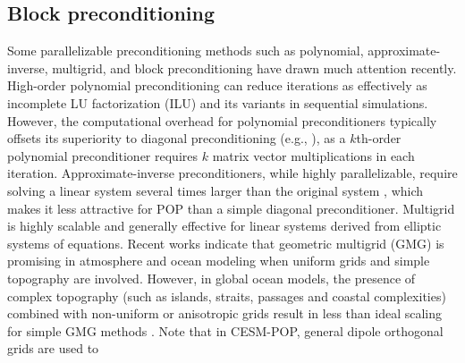 \subsection{Block preconditioning}


Some parallelizable preconditioning methods such as polynomial,
approximate-inverse, multigrid, and block preconditioning have
drawn much attention recently.  High-order polynomial preconditioning
can reduce iterations as effectively as incomplete LU factorization
(ILU) and its variants \cite{benzi2002preconditioning} in sequential
simulations.  However, the computational overhead for polynomial
preconditioners typically offsets its superiority to diagonal
preconditioning (e.g., \cite{meyer1989numerical,smith1992parallel}),
as a $k$th-order polynomial preconditioner requires $k$ matrix
vector multiplications in each iteration. Approximate-inverse
preconditioners, while highly parallelizable, require solving
a linear system several times larger than the original system 
\cite{smith1992parallel,bergamaschi2007numerical}, which makes it less
attractive for POP than a simple diagonal preconditioner.  
Multigrid is highly scalable and generally effective for linear
systems derived from elliptic systems of equations. Recent works
indicate that geometric multigrid (GMG) is promising in atmosphere
\cite{muller2014massively} and ocean
\cite{matsumura2008non,kanarska2007algorithm} modeling when uniform
grids and simple topography are involved. However,  in global ocean
models, the presence of 
complex topography (such as islands, straits, passages and coastal complexities) combined with non-uniform or anisotropic grids
result in less than ideal scaling for simple GMG methods
\cite{matsumura2008non,fulton1986multigrid,tseng2003ghost,stuben2001review}.
Note that in CESM-POP, general dipole orthogonal grids are used to
